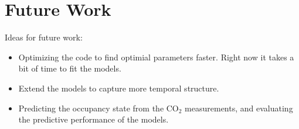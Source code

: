 \section{Future Work}
Ideas for future work: 

\begin{itemize}
    \item Optimizing the code to find optimial parameters faster. Right now it takes a bit of time to fit the models. 
    \item Extend the models to capture more temporal structure. 
    \item Predicting the occupancy state from the $\text{CO}_2$ measurements, and evaluating the predictive performance of the models.
\end{itemize}